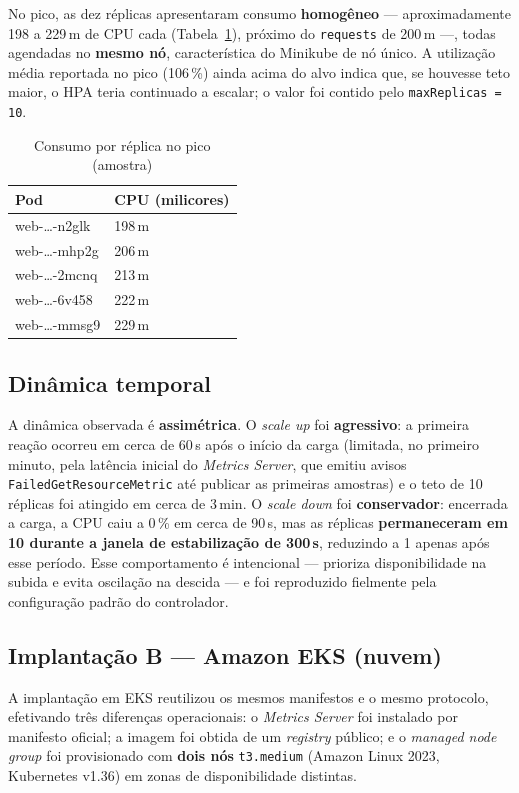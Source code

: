 \documentclass[conference]{IEEEtran}
\begin{document}
No pico, as dez réplicas apresentaram consumo \textbf{homogêneo} --- aproximadamente 198 a 229\,m
de CPU cada (Tabela~\ref{tab:top}), próximo do \texttt{requests} de 200\,m ---, todas agendadas no
\textbf{mesmo nó}, característica do Minikube de nó único. A utilização média reportada no pico
(106\,\%) ainda acima do alvo indica que, se houvesse teto maior, o HPA teria continuado a
escalar; o valor foi contido pelo \texttt{maxReplicas = 10}.

\begin{table}[!t]
\caption{Consumo por réplica no pico (amostra)}
\label{tab:top}
\centering
\footnotesize
\begin{tabular}{@{}ll@{}}
\toprule
\textbf{Pod} & \textbf{CPU (milicores)} \\
\midrule
web-\ldots-n2glk & 198\,m \\
web-\ldots-mhp2g & 206\,m \\
web-\ldots-2mcnq & 213\,m \\
web-\ldots-6v458 & 222\,m \\
web-\ldots-mmsg9 & 229\,m \\
\bottomrule
\end{tabular}
\end{table}

\subsection{Dinâmica temporal}
A dinâmica observada é \textbf{assimétrica}. O \textit{scale up} foi \textbf{agressivo}: a
primeira reação ocorreu em cerca de 60\,s após o início da carga (limitada, no primeiro minuto,
pela latência inicial do \textit{Metrics Server}, que emitiu avisos \texttt{FailedGetResourceMetric}
até publicar as primeiras amostras) e o teto de 10 réplicas foi atingido em cerca de 3\,min. O
\textit{scale down} foi \textbf{conservador}: encerrada a carga, a CPU caiu a 0\,\% em cerca de
90\,s, mas as réplicas \textbf{permaneceram em 10 durante a janela de estabilização de 300\,s},
reduzindo a 1 apenas após esse período. Esse comportamento é intencional --- prioriza
disponibilidade na subida e evita oscilação na descida --- e foi reproduzido fielmente pela
configuração padrão do controlador.

\subsection{Implantação B --- Amazon EKS (nuvem)}
A implantação em EKS reutilizou os mesmos manifestos e o mesmo protocolo, efetivando três
diferenças operacionais: o \textit{Metrics Server} foi instalado por manifesto oficial; a imagem
foi obtida de um \textit{registry} público; e o \textit{managed node group} foi provisionado com
\textbf{dois nós} \texttt{t3.medium} (Amazon Linux 2023, Kubernetes v1.36) em zonas de
disponibilidade distintas.
\end{document}
